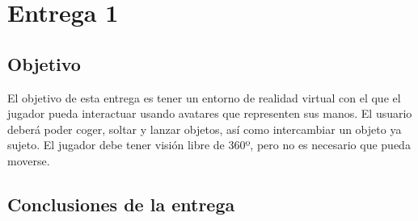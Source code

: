 \section{Entrega 1}

\subsection{Objetivo}

El objetivo de esta entrega es tener un entorno de realidad virtual con el que el jugador pueda interactuar usando avatares que representen sus manos. El usuario deberá poder coger, soltar y lanzar objetos, así como intercambiar un objeto ya sujeto. El jugador debe tener visión libre de 360º, pero no es necesario que pueda moverse.







\subsection{Conclusiones de la entrega}











